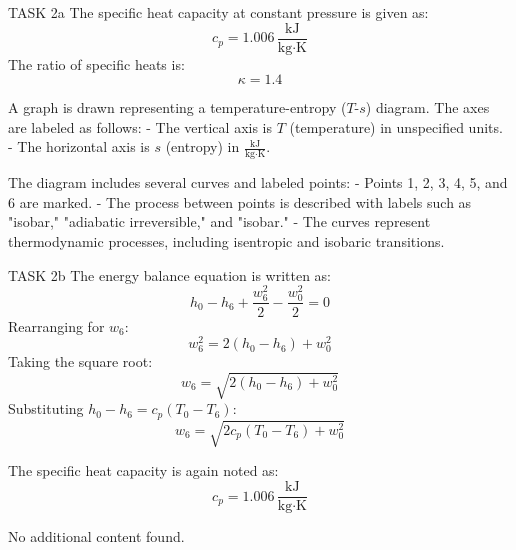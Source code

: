 TASK 2a  
The specific heat capacity at constant pressure is given as:  
\[
c_{p} = 1.006 \, \frac{\text{kJ}}{\text{kg·K}}
\]  
The ratio of specific heats is:  
\[
\kappa = 1.4
\]  

A graph is drawn representing a temperature-entropy (\(T\)-\(s\)) diagram. The axes are labeled as follows:  
- The vertical axis is \(T\) (temperature) in unspecified units.  
- The horizontal axis is \(s\) (entropy) in \(\frac{\text{kJ}}{\text{kg·K}}\).  

The diagram includes several curves and labeled points:  
- Points 1, 2, 3, 4, 5, and 6 are marked.  
- The process between points is described with labels such as "isobar," "adiabatic irreversible," and "isobar."  
- The curves represent thermodynamic processes, including isentropic and isobaric transitions.  

TASK 2b  
The energy balance equation is written as:  
\[
h_0 - h_6 + \frac{w_6^2}{2} - \frac{w_0^2}{2} = 0
\]  
Rearranging for \(w_6\):  
\[
w_6^2 = 2(h_0 - h_6) + w_0^2
\]  
Taking the square root:  
\[
w_6 = \sqrt{2(h_0 - h_6) + w_0^2}
\]  
Substituting \(h_0 - h_6 = c_p(T_0 - T_6)\):  
\[
w_6 = \sqrt{2 c_p (T_0 - T_6) + w_0^2}
\]  

The specific heat capacity is again noted as:  
\[
c_p = 1.006 \, \frac{\text{kJ}}{\text{kg·K}}
\]  

No additional content found.